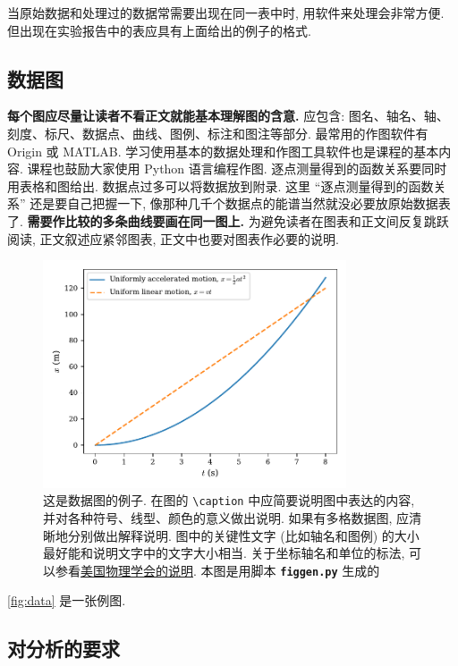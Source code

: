 \documentclass[font=fandol]{mpltx}
\newcommand{\note}[1]{{\color{gray}#1}}
\newcommand*\cs[1]{\texttt{\textbackslash #1}}
\newcommand*\file[1]{\textbf{\texttt{#1}}}
\begin{document}
当原始数据和处理过的数据常需要出现在同一表中时, 用软件来处理会非常方便.
但出现在实验报告中的表应具有上面给出的例子的格式.

\subsection{数据图}

\textbf{每个图应尽量让读者不看正文就能基本理解图的含意.}
应包含: 图名、轴名、轴、刻度、标尺、数据点、曲线、图例、标注和图注等部分.
最常用的作图软件有 Origin 或 MATLAB.
学习使用基本的数据处理和作图工具软件也是课程的基本内容.
课程也鼓励大家使用 Python 语言编程作图.
逐点测量得到的函数关系要同时用表格和图给出.
\note{数据点过多可以将数据放到附录.
	这里 ``逐点测量得到的函数关系'' 还是要自己把握一下, 像那种几千个数据点的能谱当然就没必要放原始数据表了.}
\textbf{需要作比较的多条曲线要画在同一图上.}
为避免读者在图表和正文间反复跳跃阅读, 正文叙述应紧邻图表, 正文中也要对图表作必要的说明.

\begin{figure}
	\centering
	\includegraphics[width=0.8\textwidth]{fig/figsample.pdf}
	\caption{这是数据图的例子.
		\note{在图的 \cs{caption} 中应简要说明图中表达的内容, 并对各种符号、线型、颜色的意义做出说明.
			如果有多格数据图, 应清晰地分别做出解释说明.
			图中的关键性文字 (比如轴名和图例) 的大小最好能和说明文字中的文字大小相当.
			关于坐标轴名和单位的标法, 可以参看\href{https://journals.aps.org/authors/axis-labels-and-scales-on-graphs-h18}{美国物理学会的说明}.
			本图是用脚本 \file{figgen.py} 生成的}}
	\label{fig:data}
\end{figure}

\autoref{fig:data} 是一张例图.

\subsection{对分析的要求}
\end{document}
